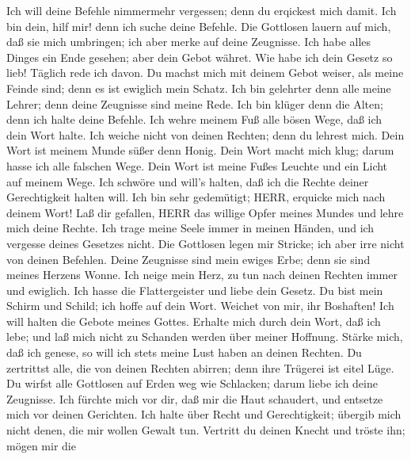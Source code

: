  Ich will deine Befehle nimmermehr vergessen; denn du
erqickest mich damit.  Ich bin dein, hilf mir! denn ich
suche deine Befehle.  Die Gottlosen lauern auf mich, daß
sie mich umbringen; ich aber merke auf deine Zeugnisse. 
Ich habe alles Dinges ein Ende gesehen; aber dein Gebot währet.
 Wie habe ich dein Gesetz so lieb! Täglich rede ich davon.
 Du machst mich mit deinem Gebot weiser, als meine Feinde
sind; denn es ist ewiglich mein Schatz.  Ich bin gelehrter
denn alle meine Lehrer; denn deine Zeugnisse sind meine Rede.
 Ich bin klüger denn die Alten; denn ich halte deine
Befehle.  Ich wehre meinem Fuß alle bösen Wege, daß ich
dein Wort halte.  Ich weiche nicht von deinen Rechten;
denn du lehrest mich.  Dein Wort ist meinem Munde süßer
denn Honig.  Dein Wort macht mich klug; darum hasse ich
alle falschen Wege.  Dein Wort ist meine Fußes Leuchte und
ein Licht auf meinem Wege.  Ich schwöre und will's halten,
daß ich die Rechte deiner Gerechtigkeit halten will.  Ich
bin sehr gedemütigt; HERR, erquicke mich nach deinem Wort!
 Laß dir gefallen, HERR das willige Opfer meines Mundes
und lehre mich deine Rechte.  Ich trage meine Seele immer
in meinen Händen, und ich vergesse deines Gesetzes nicht. 
Die Gottlosen legen mir Stricke; ich aber irre nicht von deinen
Befehlen.  Deine Zeugnisse sind mein ewiges Erbe; denn sie
sind meines Herzens Wonne.  Ich neige mein Herz, zu tun
nach deinen Rechten immer und ewiglich.  Ich hasse die
Flattergeister und liebe dein Gesetz.  Du bist mein Schirm
und Schild; ich hoffe auf dein Wort.  Weichet von mir, ihr
Boshaften! Ich will halten die Gebote meines Gottes. 
Erhalte mich durch dein Wort, daß ich lebe; und laß mich nicht zu
Schanden werden über meiner Hoffnung.  Stärke mich, daß
ich genese, so will ich stets meine Lust haben an deinen Rechten.
 Du zertrittst alle, die von deinen Rechten abirren; denn
ihre Trügerei ist eitel Lüge.  Du wirfst alle Gottlosen
auf Erden weg wie Schlacken; darum liebe ich deine Zeugnisse.
 Ich fürchte mich vor dir, daß mir die Haut schaudert, und
entsetze mich vor deinen Gerichten.  Ich halte über Recht
und Gerechtigkeit; übergib mich nicht denen, die mir wollen Gewalt tun.
 Vertritt du deinen Knecht und tröste ihn; mögen mir die
